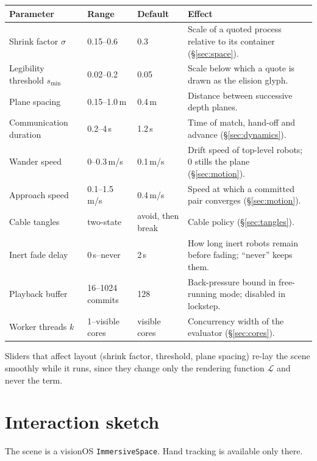 \documentclass[11pt]{article}
\begin{document}
\begin{table}[h]
\centering\small
\begin{tabularx}{\linewidth}{@{}l l l X@{}}
\toprule
Parameter & Range & Default & Effect\\
\midrule
Shrink factor $\sigma$ & 0.15--0.6 & 0.3 & Scale of a quoted process relative to its container (\S\ref{sec:space}).\\
Legibility threshold $s_{\min}$ & 0.02--0.2 & 0.05 & Scale below which a quote is drawn as the elision glyph.\\
Plane spacing & 0.15--1.0\,m & 0.4\,m & Distance between successive depth planes.\\
Communication duration & 0.2--4\,s & 1.2\,s & Time of match, hand-off and advance (\S\ref{sec:dynamics}).\\
Wander speed & 0--0.3\,m/s & 0.1\,m/s & Drift speed of top-level robots; 0 stills the plane (\S\ref{sec:motion}).\\
Approach speed & 0.1--1.5\,m/s & 0.4\,m/s & Speed at which a committed pair converges (\S\ref{sec:motion}).\\
Cable tangles & two-state & avoid, then break & Cable policy (\S\ref{sec:tangles}).\\
Inert fade delay & 0\,s--never & 2\,s & How long inert robots remain before fading; ``never'' keeps them.\\
Playback buffer & 16--1024 commits & 128 & Back-pressure bound in free-running mode; disabled in lockstep.\\
Worker threads $k$ & 1--visible cores & visible cores & Concurrency width of the evaluator (\S\ref{sec:cores}).\\
\bottomrule
\end{tabularx}
\end{table}

Sliders that affect layout (shrink factor, threshold, plane spacing) re-lay the scene
smoothly while it runs, since they change only the rendering function $\mathcal{L}$ and
never the term.

\section{Interaction sketch}\label{sec:interaction}

The scene is a visionOS \texttt{ImmersiveSpace}. Hand tracking is available only there.
\end{document}
